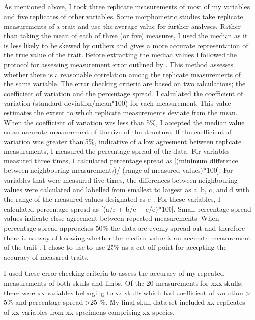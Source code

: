 \subsection{}
As mentioned above, I took three replicate measurements of most of my variables and five replicates of other variables. Some morphometric studies take replicate measurements of a trait and use the average value for further analyses. 
Rather than taking the mean of each of three (or five) measures, I used the median as it is less likely to be skewed by outliers and gives a more accurate representation of the true value of the trait.
Before extracting the median values I followed the protocol for assessing measurement error outlined by \citep{Cooper2009}. This method assesses whether there is a reasonable correlation among the replicate measurements of the same variable. The error checking criteria are based on two calculations; the coefficient of variation and the percentage spread.
I calculated the coefficient of variation (standard deviation/mean*100) for each measurement. This value estimates the extent to which replicate measurements deviate from the mean. When the coefficient of variation was less than 5\%, I accepted the median value as an accurate measurement of the size of the structure. 
If the coefficient of variation was greater than 5\%, indicative of a low agreement between replicate measurements, I measured the percentage spread of the data. For variables measured three times, I calculated percentage spread as [(minimum difference between neighbouring measurements)/ (range of measured values)*100].
For variables that were measured five times, the differences between neighbouring values were calculated and labelled from smallest to largest as a, b, c, and d with the range of the measured values designated as e \citep{Cooper2009}. For these variables, I calculated percentage spread as [(a/e + b/e + c/e)*100]. 
Small percentage spread values indicate close agreement between repeated measurements. When percentage spread approaches 50\% the data are evenly spread out and therefore there is no way of knowing whether the median value is an accurate measurement of the trait \citep{Cooper2009}. I chose to use to use 25\% as a cut off point for accepting the accuracy of measured traits.

I used these error checking criteria to assess the accuracy of my repeated measurements of both skulls and limbs. 
Of the 20 measurements for xxx skulls, there were xx variables belonging to xx skulls which had coefficient of variation > 5\% and percentage spread >25 \%. My final skull data set included xx replicates of xx variables from xx specimens comprising xx species.

